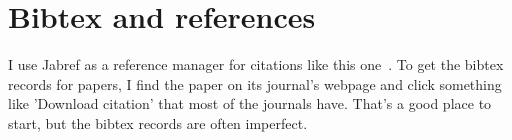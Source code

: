 \section{Bibtex and references}

\noindent I use Jabref as a reference manager for citations like this one~\cite{asmbook}. To get the bibtex records for papers, I find the paper on its journal's webpage and click something like 'Download citation' that most of the journals have. That's a good place to start, but the bibtex records are often imperfect. 


